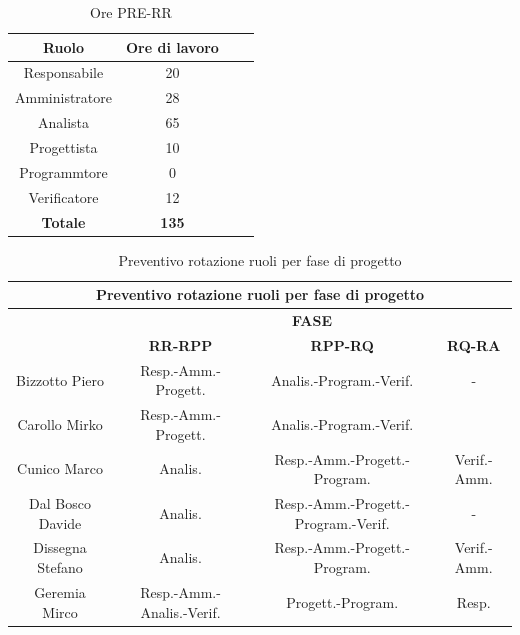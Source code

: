 \begin{table}[h]
	\begin{center}
		  \begin{tabular}{|c|c|c|c|}
		 \hline 
		 \textbf{Ruolo} & \textbf{Ore di lavoro} \\
		 \hline
		Responsabile & 20 \\
		Amministratore & 28 \\
		Analista & 65 \\
		Progettista & 10 \\
		Programmtore & 0 \\
		Verificatore & 12 \\
        \hline
        \textbf{Totale} & \textbf{135} \\
		\hline
		\end{tabular}
	\caption{Ore PRE-RR} 
	\label{tab:tabella_PRE_RR}
	\end{center}	
\end{table}

\newpage

\begin{table}[!h]
	\begin{center}
		  \begin{tabular}
			  {|c|c|c|c|}
		 \hline
			\multicolumn{4}{|c|}{ \textbf{Preventivo rotazione ruoli per fase di progetto} } \\
			\hline
			& \multicolumn{3}{|c|}{ \textbf{FASE} } \\
			\hline
			& \textbf{RR-RPP} & \textbf{RPP-RQ} & \textbf{RQ-RA} \\
			\hline
			Bizzotto Piero & Resp.-Amm.-Progett.  & Analis.-Program.-Verif.   & -   \\
			\hline
			Carollo Mirko & Resp.-Amm.-Progett.  & Analis.-Program.-Verif.   \\
			\hline
			Cunico Marco & Analis.  & Resp.-Amm.-Progett.-Program.  & Verif.-Amm.   \\
			\hline
			Dal Bosco Davide & Analis.  & Resp.-Amm.-Progett.-Program.-Verif.  & -   \\
			\hline
			Dissegna Stefano & Analis.  & Resp.-Amm.-Progett.-Program.  & Verif.-Amm.   \\
			\hline
			Geremia Mirco & Resp.-Amm.-Analis.-Verif.  & Progett.-Program.  & Resp.   \\
			\hline

		\end{tabular}
	\caption{Preventivo rotazione ruoli per fase di progetto} %
	\label{tab:TabellaRotazRuoli}
	\end{center}	
\end{table}

